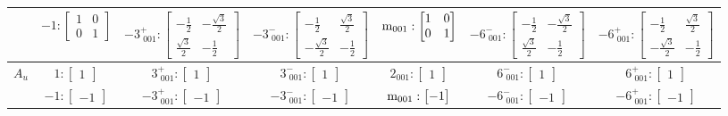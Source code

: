 \documentclass[fleqn,8pt,landscape]{jsarticle}
\begin{document}
\begin{longtable}{ccccccc}
& $ -1:\begin{bmatrix} 1 & 0 \\ 0 & 1 \end{bmatrix} $ & $ -3^{+}_{\,\,001}:\begin{bmatrix} - \frac{1}{2} & - \frac{\sqrt{3}}{2} \\ \frac{\sqrt{3}}{2} & - \frac{1}{2} \end{bmatrix} $ & $ -3^{-}_{\,\,001}:\begin{bmatrix} - \frac{1}{2} & \frac{\sqrt{3}}{2} \\ - \frac{\sqrt{3}}{2} & - \frac{1}{2} \end{bmatrix} $ & $ {\rm m}_{001}:\begin{bmatrix} 1 & 0 \\ 0 & 1 \end{bmatrix} $ & $ -6^{-}_{\,\,001}:\begin{bmatrix} - \frac{1}{2} & - \frac{\sqrt{3}}{2} \\ \frac{\sqrt{3}}{2} & - \frac{1}{2} \end{bmatrix} $ & $ -6^{+}_{\,\,001}:\begin{bmatrix} - \frac{1}{2} & \frac{\sqrt{3}}{2} \\ - \frac{\sqrt{3}}{2} & - \frac{1}{2} \end{bmatrix} $ \\ \hline
$ A_{u} $ & $ 1:\begin{bmatrix} 1 \end{bmatrix} $ & $ 3^{+}_{\,\,001}:\begin{bmatrix} 1 \end{bmatrix} $ & $ 3^{-}_{\,\,001}:\begin{bmatrix} 1 \end{bmatrix} $ & $ 2{}_{001}:\begin{bmatrix} 1 \end{bmatrix} $ & $ 6^{-}_{\,\,001}:\begin{bmatrix} 1 \end{bmatrix} $ & $ 6^{+}_{\,\,001}:\begin{bmatrix} 1 \end{bmatrix} $ \\
& $ -1:\begin{bmatrix} -1 \end{bmatrix} $ & $ -3^{+}_{\,\,001}:\begin{bmatrix} -1 \end{bmatrix} $ & $ -3^{-}_{\,\,001}:\begin{bmatrix} -1 \end{bmatrix} $ & $ {\rm m}_{001}:\begin{bmatrix} -1 \end{bmatrix} $ & $ -6^{-}_{\,\,001}:\begin{bmatrix} -1 \end{bmatrix} $ & $ -6^{+}_{\,\,001}:\begin{bmatrix} -1 \end{bmatrix} $ \\ \hline

\end{longtable}
\end{document}
